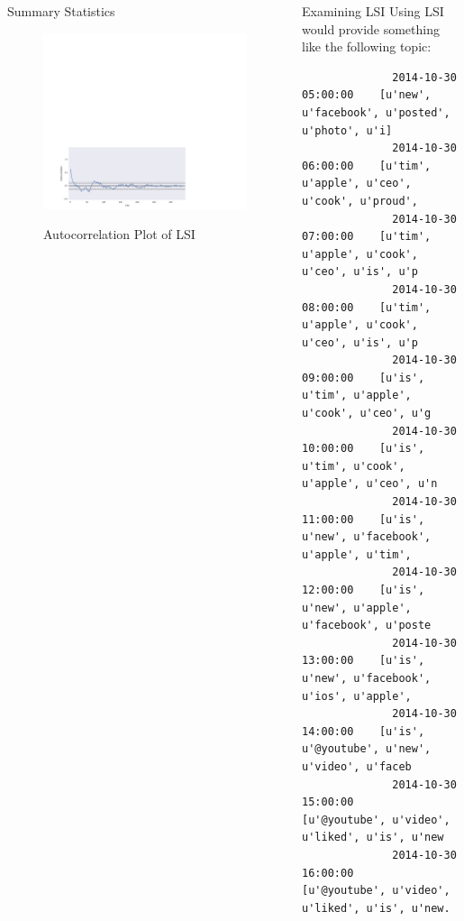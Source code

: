 \documentclass[final]{beamer}
\newlength{\onecolwid}
\newlength{\twocolwid}
\begin{document}
\begin{frame}[t]
\begin{columns}[t]
\begin{column}{\twocolwid}
\begin{columns}[t,totalwidth=\twocolwid]
\begin{column}{\onecolwid}
\begin{block}{Summary Statistics}
          \begin{figure}
          \begin{center}
            \includegraphics[width=10in]{figures/autocorr_plot.pdf} \\
            \caption{Autocorrelation Plot of LSI }
            \label{fig:autocorrplot}
          \end{center}
        \end{figure}
          \end{block}
        \end{column}
        \begin{column}{\onecolwid}\vspace{-.69in}
          \begin{block}{Examining LSI}
            Using LSI would provide something like the following topic:
            \begin{lstlisting}
              2014-10-30 05:00:00    [u'new', u'facebook', u'posted', u'photo', u'i]
              2014-10-30 06:00:00    [u'tim', u'apple', u'ceo', u'cook', u'proud', 
              2014-10-30 07:00:00    [u'tim', u'apple', u'cook', u'ceo', u'is', u'p
              2014-10-30 08:00:00    [u'tim', u'apple', u'cook', u'ceo', u'is', u'p
              2014-10-30 09:00:00    [u'is', u'tim', u'apple', u'cook', u'ceo', u'g
              2014-10-30 10:00:00    [u'is', u'tim', u'cook', u'apple', u'ceo', u'n
              2014-10-30 11:00:00    [u'is', u'new', u'facebook', u'apple', u'tim',
              2014-10-30 12:00:00    [u'is', u'new', u'apple', u'facebook', u'poste
              2014-10-30 13:00:00    [u'is', u'new', u'facebook', u'ios', u'apple',
              2014-10-30 14:00:00    [u'is', u'@youtube', u'new', u'video', u'faceb
              2014-10-30 15:00:00    [u'@youtube', u'video', u'liked', u'is', u'new
              2014-10-30 16:00:00    [u'@youtube', u'video', u'liked', u'is', u'new.


\end{lstlisting}
\end{block}
\end{column}
\end{columns}
\end{column}
\end{columns}
\end{frame}
\end{document}
